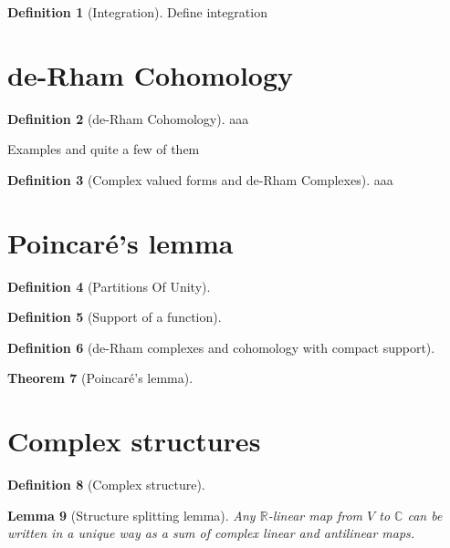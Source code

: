 \documentclass[11pt]{report}
\newtheorem{thm}{Theorem}[section]
\newtheorem{lemma}[thm]{Lemma}
\theoremstyle{definition}
\newtheorem{defn}[thm]{Definition}
\begin{document}
\begin{defn}[Integration]\label{Integration}
  Define integration 
\end{defn}


\section{de-Rham Cohomology}

\begin{defn}[de-Rham Cohomology]\label{deRham}
  aaa
\end{defn}
Examples and quite a few of them

\begin{defn}[Complex valued forms and de-Rham Complexes]\label{Cforms}
  aaa
\end{defn}

\section{Poincar\'{e}'s lemma}

\begin{defn}[Partitions Of Unity]
  
\end{defn}

\begin{defn}[Support of a function]
  
\end{defn}

\begin{defn}[de-Rham complexes and cohomology with compact support]
  
\end{defn}

\begin{thm}[Poincar\'{e}'s lemma]
  
\end{thm}

\section{Complex structures}

\begin{defn}[Complex structure]\label{Cstructure}
  
\end{defn}

\begin{lemma}[Structure splitting lemma]
  Any $\mathbb{R}$-linear map from $V$ to $\mathbb{C}$ can be written in a unique way as a sum of complex linear and antilinear maps.
\end{lemma}
\end{document}
